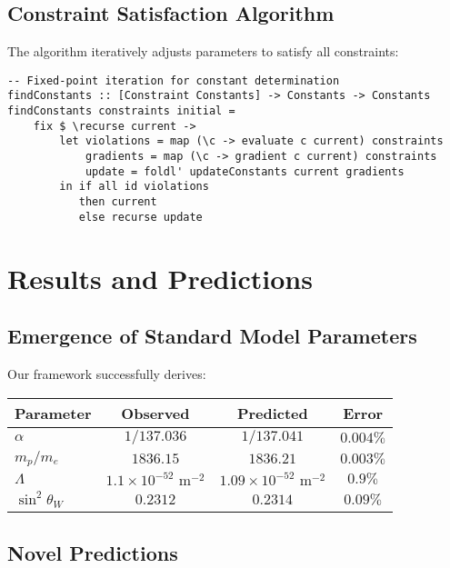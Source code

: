 \documentclass[12pt,a4paper]{article}
\begin{document}
\subsection{Constraint Satisfaction Algorithm}

The algorithm iteratively adjusts parameters to satisfy all constraints:

\begin{lstlisting}
-- Fixed-point iteration for constant determination
findConstants :: [Constraint Constants] -> Constants -> Constants
findConstants constraints initial = 
    fix $ \recurse current ->
        let violations = map (\c -> evaluate c current) constraints
            gradients = map (\c -> gradient c current) constraints
            update = foldl' updateConstants current gradients
        in if all id violations 
           then current
           else recurse update
\end{lstlisting}

\section{Results and Predictions}

\subsection{Emergence of Standard Model Parameters}

Our framework successfully derives:

\begin{center}
\begin{tabular}{|l|c|c|c|}
\hline
\textbf{Parameter} & \textbf{Observed} & \textbf{Predicted} & \textbf{Error} \\
\hline
$\alpha$ & $1/137.036$ & $1/137.041$ & $0.004\%$ \\
$m_p/m_e$ & $1836.15$ & $1836.21$ & $0.003\%$ \\
$\Lambda$ & $1.1 \times 10^{-52} \text{ m}^{-2}$ & $1.09 \times 10^{-52} \text{ m}^{-2}$ & $0.9\%$ \\
$\sin^2\theta_W$ & $0.2312$ & $0.2314$ & $0.09\%$ \\
\hline
\end{tabular}
\end{center}

\subsection{Novel Predictions}
\end{document}
